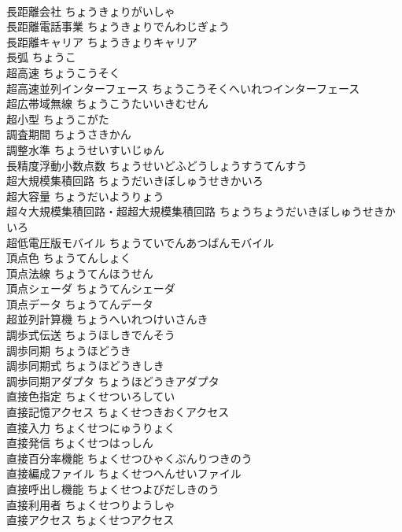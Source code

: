 \documentclass[8pt]{extreport}
\begin{document}
\begin{CJK}{UTF8}{min}
\\	長距離会社	ちょうきょりがいしゃ	
\\	長距離電話事業	ちょうきょりでんわじぎょう	
\\	長距離キャリア	ちょうきょりキャリア	
\\	長弧	ちょうこ	
\\	超高速	ちょうこうそく	
\\	超高速並列インターフェース	ちょうこうそくへいれつインターフェース	
\\	超広帯域無線	ちょうこうたいいきむせん	
\\	超小型	ちょうこがた	
\\	調査期間	ちょうさきかん	
\\	調整水準	ちょうせいすいじゅん	
\\	長精度浮動小数点数	ちょうせいどふどうしょうすうてんすう	
\\	超大規模集積回路	ちょうだいきぼしゅうせきかいろ	
\\	超大容量	ちょうだいようりょう	
\\	超々大規模集積回路・超超大規模集積回路	ちょうちょうだいきぼしゅうせきかいろ	
\\	超低電圧版モバイル	ちょうていでんあつばんモバイル	
\\	頂点色	ちょうてんしょく	
\\	頂点法線	ちょうてんほうせん	
\\	頂点シェーダ	ちょうてんシェーダ	
\\	頂点データ	ちょうてんデータ	
\\	超並列計算機	ちょうへいれつけいさんき	
\\	調歩式伝送	ちょうほしきでんそう	
\\	調歩同期	ちょうほどうき	
\\	調歩同期式	ちょうほどうきしき	
\\	調歩同期アダプタ	ちょうほどうきアダプタ	
\\	直接色指定	ちょくせついろしてい	
\\	直接記憶アクセス	ちょくせつきおくアクセス	
\\	直接入力	ちょくせつにゅうりょく	
\\	直接発信	ちょくせつはっしん	
\\	直接百分率機能	ちょくせつひゃくぶんりつきのう	
\\	直接編成ファイル	ちょくせつへんせいファイル	
\\	直接呼出し機能	ちょくせつよびだしきのう	
\\	直接利用者	ちょくせつりようしゃ	
\\	直接アクセス	ちょくせつアクセス	

\end{CJK}
\end{document}
